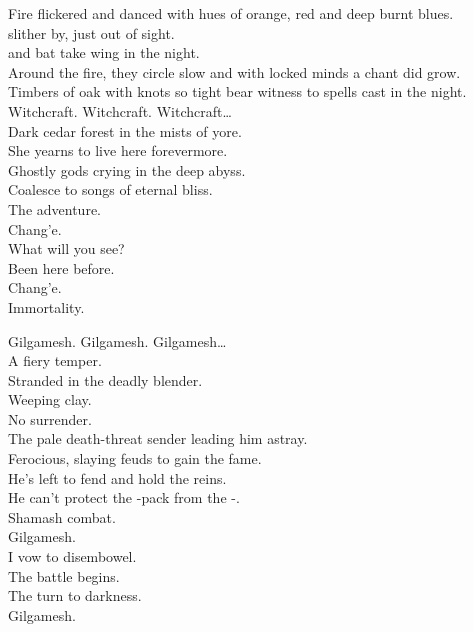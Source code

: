 
Fire flickered and danced with hues of orange, red and deep burnt blues. \\
 slither by, just out of sight. \\
 and bat take wing in the night. \\
Around the fire, they circle slow and with locked minds a chant did grow. \\
Timbers of oak with knots so tight bear witness to spells cast in the night. \\

Witchcraft. Witchcraft. Witchcraft… \\

Dark cedar forest in the mists of yore. \\
She yearns to live here forevermore. \\
Ghostly gods crying in the deep abyss. \\
Coalesce to songs of eternal bliss. \\

The adventure. \\
Chang'e. \\
What will you see? \\
Been here before. \\
Chang'e. \\
Immortality. \\



Gilgamesh. Gilgamesh. Gilgamesh… \\

A fiery temper. \\
Stranded in the deadly blender. \\
Weeping  clay. \\
No surrender. \\
The pale death-threat sender leading him astray. \\
Ferocious, slaying feuds to gain the fame. \\
He's left to fend and hold the reins. \\
He can't protect the -pack from the -. \\
Shamash combat. \\

Gilgamesh. \\
I vow to disembowel. \\
The battle begins. \\
The  turn to darkness. \\
Gilgamesh. \\

